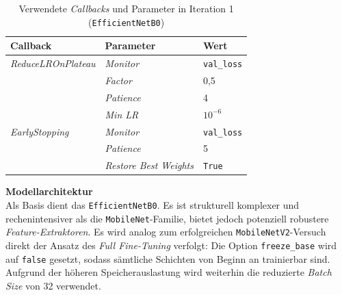 \documentclass[
    a4paper,        %
    11pt,           %
    ngerman,        %
    parskip=half,   %
    listof=totoc,   %
    bibliography=totoc %
]{scrartcl}
\begin{document}
\begin{table}[H]
    \centering
    \caption{Verwendete \textit{Callbacks} und Parameter in Iteration 1 (\texttt{EfficientNetB0})}
    \label{tab:effnetb0_callbacks_iter1}
    \begin{tabular}{lll}
        \toprule
        \textbf{Callback} & \textbf{Parameter} & \textbf{Wert} \\
        \midrule
        \textit{ReduceLROnPlateau} & \textit{Monitor} & \texttt{val\_loss} \\
                          & \textit{Factor} & 0,5 \\
                          & \textit{Patience} & 4 \\
                          & \textit{Min LR} & $10^{-6}$ \\
        \midrule
        \textit{EarlyStopping}     & \textit{Monitor} & \texttt{val\_loss} \\
                          & \textit{Patience} & 5 \\
                          & \textit{Restore Best Weights} & \texttt{True} \\
        \bottomrule
    \end{tabular}
\end{table}

\textbf{Modellarchitektur} \\
Als Basis dient das \texttt{EfficientNetB0}. Es ist strukturell komplexer und rechenintensiver als die \texttt{MobileNet}-Familie, bietet jedoch potenziell robustere \textit{Feature-Extraktoren}. Es wird analog zum erfolgreichen \texttt{MobileNetV2}-Versuch direkt der Ansatz des \textit{Full Fine-Tuning} verfolgt: Die Option \texttt{freeze\_base} wird auf \texttt{false} gesetzt, sodass sämtliche Schichten von Beginn an trainierbar sind. Aufgrund der höheren Speicherauslastung wird weiterhin die reduzierte \textit{Batch Size} von 32 verwendet.
\end{document}
